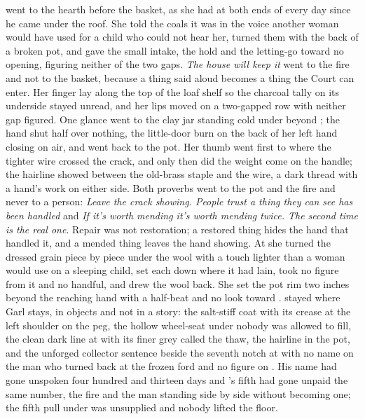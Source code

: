  went to the hearth before the basket, as she had at both ends of every day since he came under the roof. She told the coals it was  in the voice another woman would have used for a child who could not hear her, turned them with the back of a broken pot, and gave the small intake, the hold and the letting-go toward no opening, figuring neither of the two gaps. \emph{The house will keep it} went to the fire and not to the basket, because a thing said aloud becomes a thing the Court can enter. Her finger lay along the top of the loaf shelf so the charcoal tally on its underside stayed unread, and her lips moved on a two-gapped row with neither gap figured. One glance went to the clay jar standing cold under  beyond ; the hand shut half over nothing, the little-door burn on the back of her left hand closing on air, and went back to the pot. Her thumb went first to where the tighter wire crossed the crack, and only then did the weight come on the handle; the hairline showed between the old-brass staple and the wire, a dark thread with a hand's work on either side. Both proverbs went to the pot and the fire and never to a person: \emph{Leave the crack showing. People trust a thing they can see has been handled} and \emph{If it's worth mending it's worth mending twice. The second time is the real one}. Repair was not restoration; a restored thing hides the hand that handled it, and a mended thing leaves the hand showing. At  she turned the dressed grain piece by piece under the wool with a touch lighter than a woman would use on a sleeping child, set each down where it had lain, took no figure from it and no handful, and drew the wool back. She set the pot rim two inches beyond the reaching hand with a half-beat and no look toward .  stayed where Garl stays, in objects and not in a story: the salt-stiff coat with its crease at the left shoulder on the peg, the hollow wheel-seat under  nobody was allowed to fill, the clean dark line at  with its finer grey called the thaw, the hairline in the pot, and the unforged collector sentence beside the seventh notch at  with no name on the man who turned back at the frozen ford and no figure on . His name had gone unspoken four hundred and thirteen days and 's fifth had gone unpaid the same number, the fire and the man standing side by side without becoming one; the fifth pull under  was unsupplied and nobody lifted the floor.

